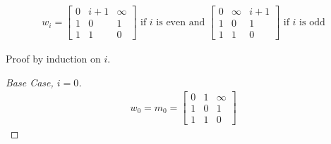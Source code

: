 \begin{prop}\label{prop:widen-1}
  \begin{align*}
    w_i =
    \begin{bmatrix}
      0 & i + 1 & \infty\\
      1 & 0 & 1\\
      1 & 1 & 0
    \end{bmatrix}
    \text{ if } i \text{ is even and }
    \begin{bmatrix}
      0 & \infty & i + 1 \\
      1 & 0 & 1\\
      1 & 1 & 0
    \end{bmatrix}
    \text{ if } i \text{ is odd}
  \end{align*}

  \noindent
  Proof by induction on $i$.

  \begin{proof}[Base Case, $i = 0$]
    \begin{align*}
      w_0 = m_0 =
      \begin{bmatrix}
        0 & 1 & \infty \\
        1 & 0 & 1 \\
        1 & 1 & 0
      \end{bmatrix}
      \tag*{\qedhere}
    \end{align*}
  \end{proof}


\end{prop}
